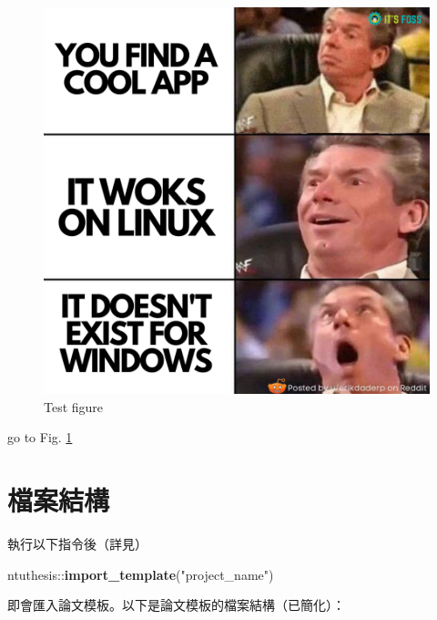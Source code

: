 \documentclass[]{book}
\newenvironment{Shaded}{}{}
\newcommand{\KeywordTok}[1]{\textcolor[rgb]{0.00,0.44,0.13}{\textbf{#1}}}
\newcommand{\NormalTok}[1]{#1}
\newcommand{\OperatorTok}[1]{\textcolor[rgb]{0.40,0.40,0.40}{#1}}
\newcommand{\StringTok}[1]{\textcolor[rgb]{0.25,0.44,0.63}{#1}}
\begin{document}
\begin{figure}
\hypertarget{fig:meme}{%
\centering
\includegraphics{figures/os_meme.png}
\caption{Test figure}\label{fig:meme}
}
\end{figure}

go to Fig. \ref{fig:meme}

\hypertarget{dir-structure}{%
\section{檔案結構}\label{dir-structure}}

執行以下指令後（詳見）

\begin{Shaded}
\begin{Highlighting}[]
\NormalTok{ntuthesis}\OperatorTok{::}\KeywordTok{import\_template}\NormalTok{(}\StringTok{"project\_name"}\NormalTok{)}
\end{Highlighting}
\end{Shaded}

即會匯入論文模板。以下是論文模板的檔案結構（已簡化）：
\end{document}
